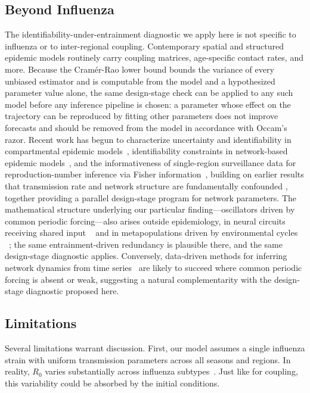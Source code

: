 \documentclass[11pt]{article}
\begin{document}
\subsection{Beyond Influenza}
The identifiability-under-entrainment diagnostic we apply here is not
specific to influenza or to inter-regional coupling. Contemporary spatial and structured
epidemic models routinely carry coupling matrices, age-specific
contact rates, and more. Because the Cram\'er-Rao lower bound bounds
the variance of every unbiased estimator and is computable from the
model and a hypothesized parameter value alone, the same design-stage
check can be applied to any such model before any inference pipeline
is chosen: a parameter whose effect on the trajectory can be
reproduced by fitting other parameters does not improve forecasts and
should be removed from the model in accordance with Occam's razor.
Recent work has begun to characterize uncertainty and identifiability
in compartmental epidemic models~\citep{edeling2021, kharazmi2021},
identifiability constraints in network-based epidemic
models~\citep{kiss2023parameter, dilauro2020, kiss2024towards}, and
the informativeness of single-region surveillance data for
reproduction-number inference via Fisher
information~\citep{parag2022}, building on earlier results that
transmission rate and network structure are fundamentally confounded
\citep{welch2011}, together providing a parallel design-stage program
for network parameters. The mathematical structure underlying our
particular finding---oscillators driven by common periodic
forcing---also arises outside epidemiology, in neural circuits
receiving shared input
~\citep{reid2019, pikovsky2001}
and in metapopulations driven by environmental
cycles
~\citep{bjornstad1999};
the same entrainment-driven redundancy is plausible there, and the
same design-stage diagnostic applies. Conversely, data-driven methods
for inferring network dynamics from time series~\citep{gao2022} are
likely to succeed where common periodic forcing is absent or weak,
suggesting a natural complementarity with the design-stage diagnostic
proposed here.

\subsection{Limitations}
Several limitations warrant discussion. First, our model assumes a
single influenza strain with uniform transmission parameters across
all seasons and regions. In reality, $R_0$ varies substantially across
influenza subtypes~\citep{biggerstaff2014}. Just like for
coupling, this variability could be absorbed by the initial
conditions.
\end{document}
